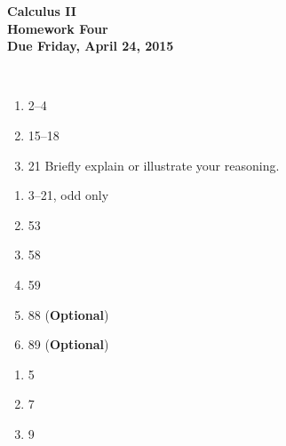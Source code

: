 \documentclass[12pt]{article}
\begin{document}
\pagestyle{empty}
 
\begin{center}
{\large {\bf Calculus II}}\\
\medskip
{\large {\bf Homework Four}}\\
\medskip
{ {\bf Due Friday, April 24, 2015}}\\
\end{center}
\hspace{2mm}\\



\begin{enumerate}
\setlength{\itemsep}{-1mm}
  \item 2--4
  \item 15--18
  \item 21 Briefly explain or illustrate your reasoning.
\end{enumerate}



\begin{enumerate}
\setlength{\itemsep}{-1mm}
  \item 3--21, odd only
  \item 53
  \item 58
  \item 59
  \item 88 ({\bf Optional})
  \item 89 ({\bf Optional})

\end{enumerate}


\begin{enumerate}
\setlength{\itemsep}{-1mm}
  \item 5
  \item 7
  \item 9
\end{enumerate}


%
%


%
%
\end{document}
